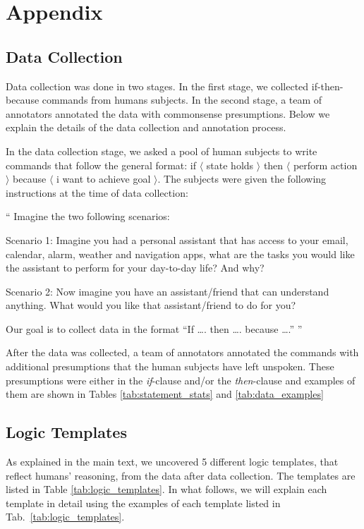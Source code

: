 \section*{Appendix}
\subsection*{Data Collection}
Data collection was done in two stages. In the first stage, we collected if-then-because commands from humans subjects. In the second stage, a team of annotators annotated the data with commonsense presumptions. Below we explain the details of the data collection and annotation process.

In the data collection stage, we asked a pool of human subjects to write commands that follow the general format: if $\langle$ state holds $\rangle$ then $\langle$ perform action $\rangle$ because $\langle$ i want to achieve goal $\rangle$. The subjects were given the following instructions at the time of data collection:

``
Imagine the two following scenarios:

Scenario 1: Imagine you had a personal assistant that has access to your email, calendar, alarm, weather and navigation apps, what are the tasks you would like the assistant to perform for your day-to-day life? And why?

Scenario 2: Now imagine you have an assistant/friend that can understand anything. What would you like that assistant/friend to do for you?

Our goal is to collect data in the format ``If …. then …. because ….''
''


After the data was collected, a team of annotators annotated the commands with additional presumptions that the human subjects have left unspoken. These presumptions were either in the \emph{if}-clause and/or the \emph{then}-clause and examples of them are shown in Tables \ref{tab:statement_stats} and \ref{tab:data_examples}


\subsection*{Logic Templates}
As explained in the main text, we uncovered 5 different logic templates, that reflect humans' reasoning, from the data after data collection. The templates are listed in Table \ref{tab:logic_templates}. In what follows, we will explain each template in detail using the examples of each template listed in Tab.~\ref{tab:logic_templates}.

